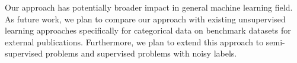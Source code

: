 \documentclass{article}
\theoremstyle{plain}
\theoremstyle{definition}
\begin{document}
Our approach has potentially broader impact in general machine learning field. As future work, we plan to compare our approach with existing unsupervised learning approaches specifically for categorical data on benchmark datasets for external publications. Furthermore, we plan to extend this approach to semi-supervised problems and supervised problems with noisy labels.



%
\end{document}
